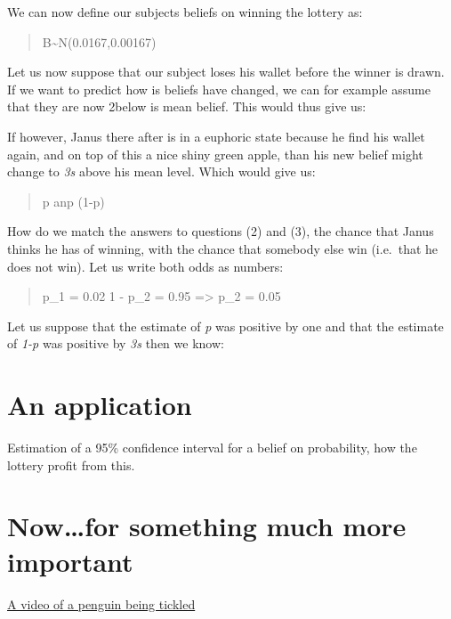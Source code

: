 \documentclass[draft.tex]{subfiles}
\begin{document}

We can now define our subjects beliefs on winning the lottery as:

\begin{quote}
B\textasciitilde{}N(0.0167,0.00167)
\end{quote}

Let us now suppose that our subject loses his wallet before the winner
is drawn. If we want to predict how is beliefs have changed, we can for
example assume that they are now 2below is mean belief. This would thus
give us:


If however, Janus there after is in a euphoric state because he find his
wallet again, and on top of this a nice shiny green apple, than his new
belief might change to \emph{3s} above his mean level. Which would give
us:


\begin{quote}
p anp (1-p)
\end{quote}

How do we match the answers to questions (2) and (3), the chance that
Janus thinks he has of winning, with the chance that somebody else win
(i.e.~that he does not win). Let us write both odds as numbers:

\begin{quote}
p\_1 = 0.02 1 - p\_2 = 0.95 =\textgreater{} p\_2 = 0.05
\end{quote}

Let us suppose that the estimate of \emph{p} was positive by one and
that the estimate of \emph{1-p} was positive by \emph{3s} then we know:


\section{An application}

Estimation of a 95\% confidence interval for a belief on probability,
how the lottery profit from this.

\section{Now\ldots{}for something much more important}

\href{http://www.youtube.com/watch?v=FVwtTrlPSSk}{A video of a penguin
being tickled}
\end{document}
